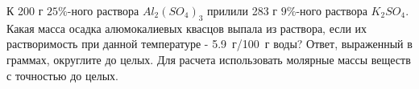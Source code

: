 
К 200 г $25\%$-ного раствора $Al_2(SO_4)_3$
прилили 283 г $9\%$-ного раствора $K_2SO_4$. Какая масса осадка
алюмокалиевых квасцов выпала из раствора, если их растворимость при данной
температуре - 5.9~г/100~г воды? Ответ, выраженный в граммах, округлите до целых.
Для расчета использовать молярные массы веществ с точностью до целых.



